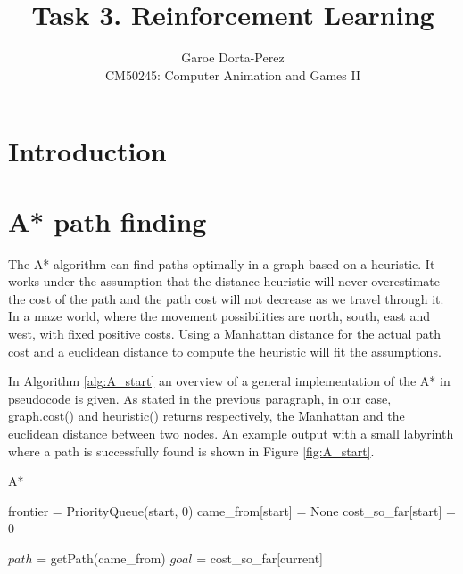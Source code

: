 \documentclass[12pt]{article}
\begin{document}
  
\title{Task 3. Reinforcement Learning}
\author{Garoe Dorta-Perez\\
CM50245: Computer Animation and Games II}
 
\maketitle
 
\section{Introduction}

\section{A* path finding}

The A* algorithm can find paths optimally in a graph based on a heuristic.
It works under the assumption that the distance heuristic will never overestimate the cost of the path and the path cost will not decrease as we travel through it.
In a maze world, where the movement possibilities are north, south, east and west, with fixed positive costs.
Using a Manhattan distance for the actual path cost and a euclidean distance to compute the heuristic will fit the assumptions.

In Algorithm \ref{alg:A_start} an overview of a general implementation of the A* in pseudocode is given.
As stated in the previous paragraph, in our case, graph.cost() and heuristic() returns respectively, the Manhattan and the euclidean distance between two nodes. An example output with a small labyrinth where a path is successfully found is shown in Figure \ref{fig:A_start}.

\begin{algorithm}[htbp!] \label{alg:A_start}
	\caption{A*}
	
	frontier = PriorityQueue(start, 0)\;
	came\_from[start] = None\;
	cost\_so\_far[start] = 0\;

	$path$ = getPath(came\_from)\;
	$goal$ = cost\_so\_far[current]\;
\end{algorithm}
\end{document}
